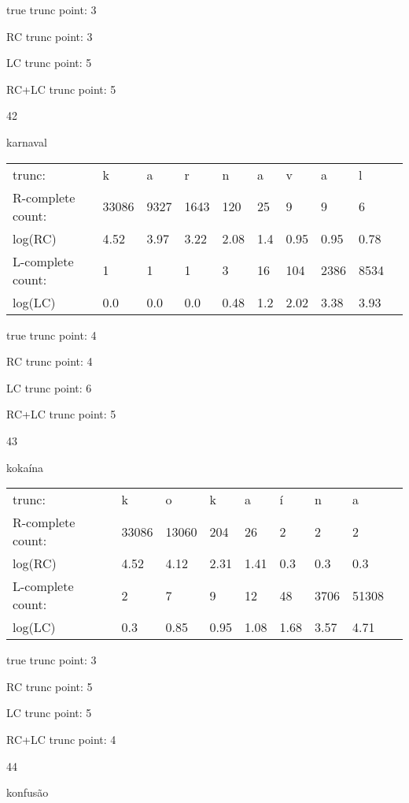 \documentclass{article}
\begin{document}
true trunc point: 3

RC trunc point: 3

LC trunc point: 5

RC+LC trunc point: 5

\vspace{1em}

42

karnaval

\begin{tabular}{l|lllllllll}
trunc: & k & a & r & n & a & v & a & l & \\ 
R-complete count: & 33086 & 9327 & 1643 & 120 & 25 & 9 & 9 & 6 & \\ 
log(RC) & 4.52 & 3.97 & 3.22 & 2.08 & 1.4 & 0.95 & 0.95 & 0.78 & \\ 
L-complete count: & 1 & 1 & 1 & 3 & 16 & 104 & 2386 & 8534 & \\ 
log(LC) & 0.0 & 0.0 & 0.0 & 0.48 & 1.2 & 2.02 & 3.38 & 3.93 & \\ 
\end{tabular}

true trunc point: 4

RC trunc point: 4

LC trunc point: 6

RC+LC trunc point: 5

\vspace{1em}

43

kokaína

\begin{tabular}{l|llllllll}
trunc: & k & o & k & a & í & n & a & \\ 
R-complete count: & 33086 & 13060 & 204 & 26 & 2 & 2 & 2 & \\ 
log(RC) & 4.52 & 4.12 & 2.31 & 1.41 & 0.3 & 0.3 & 0.3 & \\ 
L-complete count: & 2 & 7 & 9 & 12 & 48 & 3706 & 51308 & \\ 
log(LC) & 0.3 & 0.85 & 0.95 & 1.08 & 1.68 & 3.57 & 4.71 & \\ 
\end{tabular}

true trunc point: 3

RC trunc point: 5

LC trunc point: 5

RC+LC trunc point: 4

\vspace{1em}

44

konfusão
\end{document}
